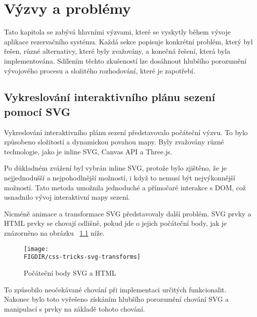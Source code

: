 \chapter{Výzvy a problémy}
\label{ch:vyzvy-a-problemy}
Tato kapitola se zabývá hlavními výzvami, které se vyskytly během vývoje aplikace rezervačního systému.
Každá sekce popisuje konkrétní problém, který byl řešen, různé alternativy, které byly zvažovány, a konečná řešení, která byla implementována.
Sdílením těchto zkušeností lze dosáhnout hlubšího porozumění vývojového procesu a složitého rozhodování, které je zapotřebí.

\section{Vykreslování interaktivního plánu sezení pomocí SVG}
\label{sec:vyzvy-a-problemy-rendering-sedadel}
Vykreslování interaktivního plánu sezení představovalo počáteční výzvu.
To bylo způsobeno složitostí a dynamickou povahou mapy.
Byly zvažovány různé technologie, jako je inline SVG, Canvas API a Three.js.

Po důkladném zvážení byl vybrán inline SVG, protože bylo zjištěno, že je nejjednodušší a nejpohodlnější možností, i když to nemusí být nejvýkonnější možností.
Tato metoda umožnila jednoduché a přímočaré interakce s DOM, což usnadnilo vývoj interaktivní mapy sezení.

Nicméně animace a transformace SVG představovaly další problém.
SVG prvky a HTML prvky se chovají odlišně, pokud jde o jejich počáteční body, jak je znázorněno na obrázku ~\ref{fig:css-tricks-svg-transforms} níže.

\begin{figure}[H]
    \centering
    \texttt{[image: \\FIGDIR/css-tricks-svg-transforms]}
    \caption{Počáteční body SVG a HTML}
    \label{fig:css-tricks-svg-transforms}
\end{figure}

To způsobilo neočekávané chování při implementaci určitých funkcionalit.
Nakonec bylo toto vyřešeno získáním hlubšího porozumění chování SVG a manipulací s prvky na základě tohoto chování.

